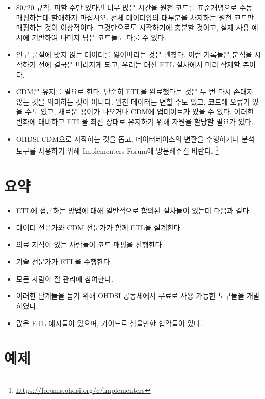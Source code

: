 \documentclass[11pt]{book}
\providecommand{\tightlist}{%
  \setlength{\itemsep}{0pt}\setlength{\parskip}{0pt}}
\let\rmarkdownfootnote\footnote%
\def\footnote{\protect\rmarkdownfootnote}
\theoremstyle{definition}
\theoremstyle{definition}
\theoremstyle{definition}
\theoremstyle{remark}
\let\BeginKnitrBlock\begin \let\EndKnitrBlock\end
\begin{document}
\begin{itemize}
\tightlist
\item
  80/20 규칙. 피할 수만 있다면 너무 많은 시간을 원천 코드를 표준개념으로
  수동 매핑하는데 할애하지 마십시오. 전체 데이터양의 대부분을 차지하는
  원천 코드만 매핑하는 것이 이상적이다. 그것만으로도 시작하기에 충분할
  것이고, 실제 사용 예시에 기반하여 나머지 남은 코드들도 다룰 수 있다.
\item
  연구 품질에 맞지 않는 데이터를 잃어버리는 것은 괜찮다. 이런 기록들은
  분석을 시작하기 전에 결국은 버려지게 되고, 우리는 대신 ETL 절차에서
  미리 삭제할 뿐이다.
\item
  CDM은 유지를 필요로 한다. 단순히 ETL을 완료했다는 것은 두 번 다시
  손대지 않는 것을 의미하는 것이 아니다. 원천 데이터는 변할 수도 있고,
  코드에 오류가 있을 수도 있고, 새로운 용어가 나오거나 CDM에 업데이트가
  있을 수 있다. 이러한 변화에 대비하고 ETL을 최신 상태로 유지하기 위해
  자원을 할당할 필요가 있다.
\item
  OHDSI CDM으로 시작하는 것을 돕고, 데이터베이스의 변환을 수행하거나
  분석 도구를 사용하기 위해 Implementers Forum에 방문해주길 바란다.
  \footnote{\url{https://forums.ohdsi.org/c/implementers}}
\end{itemize}

\section{요약}\label{-4}

\BeginKnitrBlock{rmdsummary}
\begin{itemize}
\item
  ETL에 접근하는 방법에 대해 일반적으로 합의된 절차들이 있는데 다음과
  같다.
\item
  데이터 전문가와 CDM 전문가가 함께 ETL을 설계한다.
\item
  의료 지식이 있는 사람들이 코드 매핑을 진행한다.
\item
  기술 전문가가 ETL을 수행한다.
\item
  모든 사람이 질 관리에 참여한다.
\item
  이러한 단계들을 돕기 위해 OHDSI 공동체에서 무료로 사용 가능한 도구들을
  개발하였다.
\item
  많은 ETL 예시들이 있으며, 가이드로 삼을만한 협약들이 있다.
\end{itemize}
\EndKnitrBlock{rmdsummary}

\section{예제}\label{-2}
\end{document}
